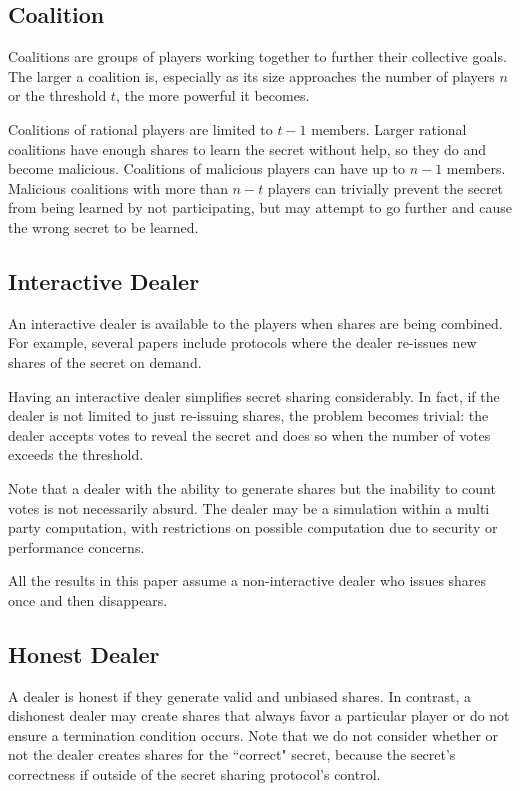 \documentclass{dalcsthesis}
\begin{document}
\subsection{Coalition}

Coalitions are groups of players working together to further their collective goals. The larger a coalition is, especially as its size approaches the number of players $n$ or the threshold $t$, the more powerful it becomes.

Coalitions of rational players are limited to $t-1$ members. Larger rational coalitions have enough shares to learn the secret without help, so they do and become malicious. Coalitions of malicious players can have up to $n-1$ members. Malicious coalitions with more than $n-t$ players can trivially prevent the secret from being learned by not participating, but may attempt to go further and cause the wrong secret to be learned.

\subsection{Interactive Dealer}

An interactive dealer is available to the players when shares are being combined. For example, several papers \cite{halpern04, gordon06, maleka08} include protocols where the dealer re-issues new shares of the secret on demand.

Having an interactive dealer simplifies secret sharing considerably. In fact, if the dealer is not limited to just re-issuing shares, the problem becomes trivial: the dealer accepts votes to reveal the secret and does so when the number of votes exceeds the threshold.

Note that a dealer with the ability to generate shares but the inability to count votes is not necessarily absurd. The dealer may be a simulation within a multi party computation, with restrictions on possible computation due to security or performance concerns.

All the results in this paper assume a non-interactive dealer who issues shares once and then disappears.

\subsection{Honest Dealer}

A dealer is honest if they generate valid and unbiased shares. In contrast, a dishonest dealer may create shares that always favor a particular player or do not ensure a termination condition occurs. Note that we do not consider whether or not the dealer creates shares for the ``correct" secret, because the secret's correctness if outside of the secret sharing protocol's control.
\end{document}

